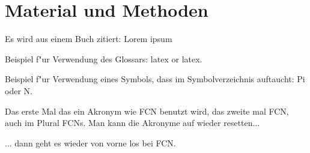 \section{Material und Methoden}
Es wird aus einem Buch zitiert: Lorem ipsum\cite{Krom}

Beispiel f"ur Verwendung des Glossars: \Gls{latex} or \gls{latex}.

Beispiel f"ur Verwendung eines Symbols, dass im Symbolverzeichnis
auftaucht: \gls{Pi} oder \gls{N}.

Das erste Mal das ein Akronym wie \gls{FCN} benutzt wird, das zweite
mal \gls{FCN}, auch im Plural \glspl{FCN}. Man kann die Akronyme auf
wieder resetten...

\glsresetall

... dann geht es wieder von vorne los bei \gls{FCN}.